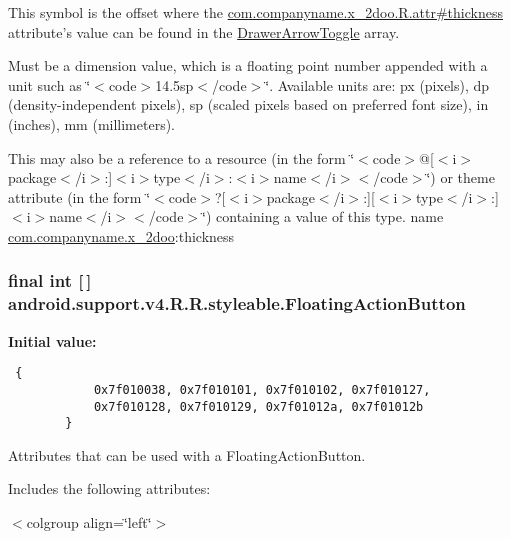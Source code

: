 This symbol is the offset where the \hyperlink{classcom_1_1companyname_1_1x__2doo_1_1_r_1_1attr_ebe368917b104183cc0d9e8f392b784e}{com.companyname.x\_\-2doo.R.attr\#thickness} attribute's value can be found in the \hyperlink{classandroid_1_1support_1_1v4_1_1_r_1_1styleable_df2952a999161d3c408fb6267800afe6}{DrawerArrowToggle} array.

Must be a dimension value, which is a floating point number appended with a unit such as \char`\"{}$<$code$>$14.5sp$<$/code$>$\char`\"{}. Available units are: px (pixels), dp (density-independent pixels), sp (scaled pixels based on preferred font size), in (inches), mm (millimeters). 

This may also be a reference to a resource (in the form \char`\"{}$<$code$>$@\mbox{[}$<$i$>$package$<$/i$>$:\mbox{]}$<$i$>$type$<$/i$>$:$<$i$>$name$<$/i$>$$<$/code$>$\char`\"{}) or theme attribute (in the form \char`\"{}$<$code$>$?\mbox{[}$<$i$>$package$<$/i$>$:\mbox{]}\mbox{[}$<$i$>$type$<$/i$>$:\mbox{]}$<$i$>$name$<$/i$>$$<$/code$>$\char`\"{}) containing a value of this type.  name \hyperlink{namespacecom_1_1companyname_1_1x__2doo}{com.companyname.x\_\-2doo}:thickness \hypertarget{classandroid_1_1support_1_1v4_1_1_r_1_1styleable_51a0276d7190a1195d58170b1623ab3c}{
\subsubsection[{FloatingActionButton}]{\setlength{\rightskip}{0pt plus 5cm}final int \mbox{[}$\,$\mbox{]} android.support.v4.R.R.styleable.FloatingActionButton}}
\label{classandroid_1_1support_1_1v4_1_1_r_1_1styleable_51a0276d7190a1195d58170b1623ab3c}


\textbf{Initial value:}

\begin{Code}\begin{verbatim} {
            0x7f010038, 0x7f010101, 0x7f010102, 0x7f010127,
            0x7f010128, 0x7f010129, 0x7f01012a, 0x7f01012b
        }
\end{verbatim}
\end{Code}
Attributes that can be used with a FloatingActionButton. 

Includes the following attributes: \begin{TabularC}{0}
\hline
\end{TabularC}
$<$colgroup align=\char`\"{}left\char`\"{}$>$ 

